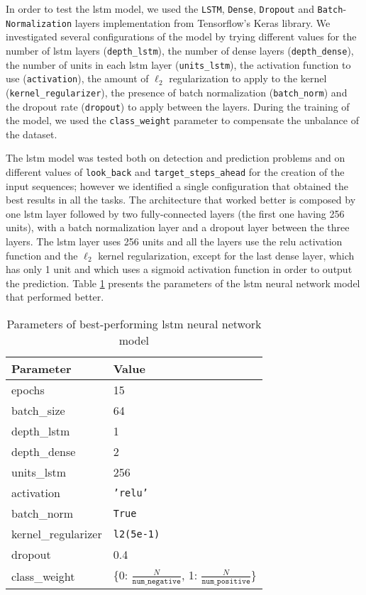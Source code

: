 In order to test the \acs{lstm} model, we used the \texttt{LSTM}, \texttt{Dense}, \texttt{Dropout} and \texttt{Batch}-\texttt{Normalization} layers implementation from Tensorflow's Keras library. We investigated several configurations of the model by trying different values for the number of \acs{lstm} layers (\texttt{depth\_lstm}), the number of dense layers (\texttt{depth\_dense}), the number of units in each \acs{lstm} layer (\texttt{units\_lstm}), the activation function to use (\texttt{activation}), the amount of $\ell_2$ regularization to apply to the kernel (\texttt{kernel\_regularizer}), the presence of batch normalization (\texttt{batch\_norm}) and the dropout rate (\texttt{dropout}) to apply between the layers. During the training of the model, we used the \texttt{class\_weight} parameter to compensate the unbalance of the dataset.

The \acs{lstm} model was tested both on detection and prediction problems and on different values of \texttt{look\_back} and \texttt{target\_steps\_ahead} for the creation of the input sequences; however we identified a single configuration that obtained the best results in all the tasks. The architecture that worked better is composed by one \acs{lstm} layer followed by two fully-connected layers (the first one having 256 units), with a batch normalization layer and a dropout layer between the three layers. The \acs{lstm} layer uses 256 units and all the layers use the \acs{relu} activation function and the $\ell_2$ kernel regularization, except for the last dense layer, which has only 1 unit and which uses a sigmoid activation function in order to output the prediction. Table \ref{tab:lstm_param} presents the parameters of the \acs{lstm} neural network model that performed better.
\begin{table}[htbp]
    \centering
    \begin{tabular}{ll}
        \hline
        \textbf{Parameter}  & \textbf{Value} \\\hline
        epochs              & 15 \\
        batch\_size         & 64 \\
        depth\_lstm         & 1 \\
        depth\_dense        & 2 \\
        units\_lstm         & 256 \\
        activation          & \texttt{'relu'} \\
        batch\_norm         & \texttt{True} \\
        kernel\_regularizer & \texttt{l2(5e-1)} \\
        dropout             & 0.4 \\
        class\_weight       & \{0: $\frac{N}{\texttt{num\_negative}}$, 1: $\frac{N}{\texttt{num\_positive}}$\}
    \end{tabular}
    \caption{Parameters of best-performing \acs{lstm} neural network model}
    \label{tab:lstm_param}
\end{table}

